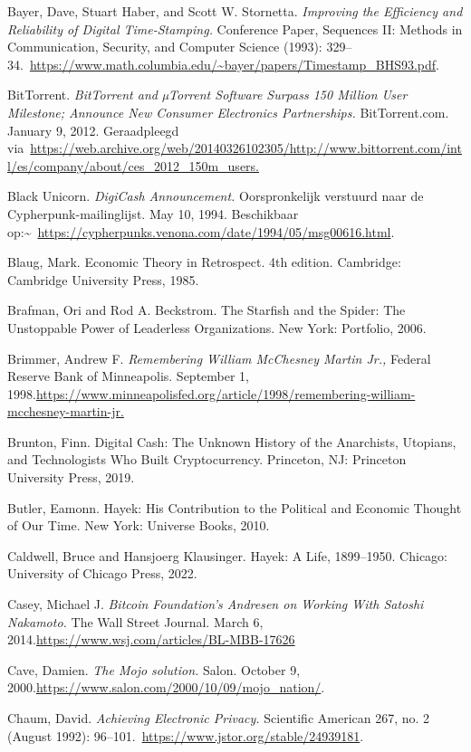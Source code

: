 \documentclass[smalldemyvopaper,11pt,twoside,onecolumn,openright,extrafontsizes,hidelinks]{memoir}
\begin{document}
Bayer, Dave, Stuart Haber, and Scott W. Stornetta. \emph{Improving the
Efficiency and Reliability of Digital Time-Stamping.} Conference Paper,
Sequences II: Methods in Communication, Security, and Computer Science
(1993):
329--34.~\url{https://www.math.columbia.edu/~bayer/papers/Timestamp_BHS93.pdf}.

BitTorrent. \emph{BitTorrent and µTorrent Software Surpass 150 Million
User Milestone; Announce New Consumer Electronics Partnerships.}
BitTorrent.com. January 9, 2012. Geraadpleegd
via~\href{https://web.archive.org/web/20140326102305/http:/www.bittorrent.com/intl/es/company/about/ces_2012_150m_users.}{https://web.archive.org/web/20140326102305/http://www.bittorrent.com/intl/es/company/about/ces\_2012\_150m\_users.}

Black Unicorn. \emph{DigiCash Announcement.} Oorspronkelijk verstuurd
naar de Cypherpunk-mailinglijst. May 10, 1994. Beschikbaar
op:\textasciitilde~\url{https://cypherpunks.venona.com/date/1994/05/msg00616.html}.

Blaug, Mark. Economic Theory in Retrospect. 4th edition. Cambridge:
Cambridge University Press, 1985.

Brafman, Ori and Rod A. Beckstrom. The Starfish and the Spider: The
Unstoppable Power of Leaderless Organizations. New York: Portfolio,
2006.

Brimmer, Andrew F. \emph{Remembering William McChesney Martin Jr.,}
Federal Reserve Bank of Minneapolis. September 1,
1998.\url{https://www.minneapolisfed.org/article/1998/remembering-william-mcchesney-martin-jr.}

Brunton, Finn. Digital Cash: The Unknown History of the Anarchists,
Utopians, and Technologists Who Built Cryptocurrency. Princeton, NJ:
Princeton University Press, 2019.

Butler, Eamonn. Hayek: His Contribution to the Political and Economic
Thought of Our Time. New York: Universe Books, 2010.

Caldwell, Bruce and Hansjoerg Klausinger. Hayek: A Life, 1899--1950.
Chicago: University of Chicago Press, 2022.

Casey, Michael J. \emph{Bitcoin Foundation's Andresen on Working With
Satoshi Nakamoto.} The Wall Street Journal. March 6,
2014.\url{https://www.wsj.com/articles/BL-MBB-17626}

Cave, Damien. \emph{The Mojo solution.} Salon. October 9,
2000.\url{https://www.salon.com/2000/10/09/mojo_nation/}.

Chaum, David. \emph{Achieving Electronic Privacy.} Scientific American
267, no. 2 (August 1992):
96--101.~\url{https://www.jstor.org/stable/24939181}.
\end{document}
